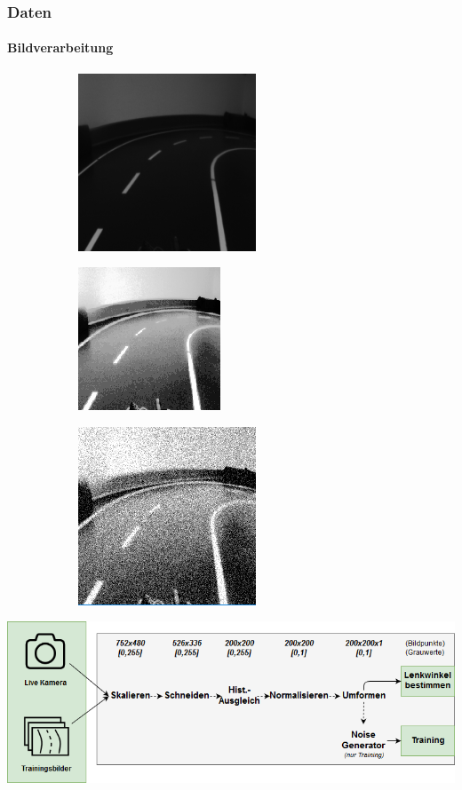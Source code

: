\documentclass{beamer}
\begin{document}
\begin{frame}
\frametitle{Daten}
\framesubtitle{Bildverarbeitung}

\begin{minipage}{\textwidth}
\begin{figure}

	\begin{subfigure}{.25\textwidth}
		  \includegraphics[scale=0.32]{figures/200x200.png}
	\end{subfigure}%
	\begin{subfigure}{.25\textwidth}
		  \includegraphics[scale=0.4]{figures/200x200Hist.png}
	\end{subfigure}%
	\begin{subfigure}{.25\textwidth}
		  \includegraphics[scale=0.43]{figures/200x200Gauss.png}
	\end{subfigure}%
\end{figure}
\end{minipage}

\begin{minipage}{\textwidth}
\includegraphics[width=\linewidth]{figures/Pipeline.png}	
\end{minipage}
\end{frame}
\end{document}
